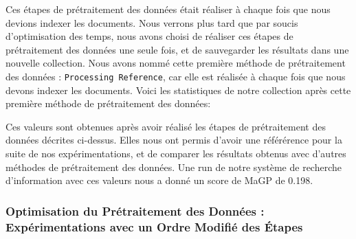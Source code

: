 \documentclass[a4paper, 12pt]{article}
\begin{document}
Ces étapes de prétraitement des données était réaliser à chaque fois que nous devions indexer les documents.
Nous verrons plus tard que par soucis d'optimisation des temps, nous avons choisi de réaliser ces étapes de prétraitement des données une seule fois, et de sauvegarder les résultats dans une nouvelle collection.
Nous avons nommé cette première méthode de prétraitement des données : \texttt{Processing Reference},
car elle est réalisée à chaque fois que nous devons indexer les documents.
Voici les statistiques de notre collection après cette première méthode de prétraitement des données:

\begin{table}[!h]
  \begin{minipage}{0.35\linewidth}
      \centering
      \caption{Statistiques de la collection}
  \end{minipage}%
  \hspace{0.05\linewidth} %
  \begin{minipage}{0.60\linewidth}
      Ces valeurs sont obtenues après avoir réalisé les étapes de prétraitement des données décrites ci-dessus.
      Elles nous ont permis d'avoir une référérence pour la suite de nos expérimentations, et de comparer les résultats obtenus avec d'autres méthodes de prétraitement des données.
      Une run de notre système de recherche d'information avec ces valeurs nous a donné un score de MaGP de 0.198.
  \end{minipage}
\end{table}

\subsubsection{Optimisation du Prétraitement des Données : Expérimentations avec un Ordre Modifié des Étapes}
\end{document}
